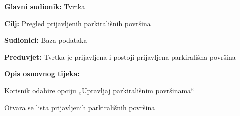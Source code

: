 					\begin{packed_item}
						
						\item  \textbf{Glavni sudionik: } Tvrtka
						\item  \textbf{Cilj:} Pregled prijavljenih parkirališnih površina
						\item  \textbf{Sudionici:} Baza podataka
						\item  \textbf{Preduvjet:} Tvrtka je prijavljena i postoji prijavljena parkirališna površina
						\item  \textbf{Opis osnovnog tijeka:}
						
						\item[] \begin{packed_enum}
							\item Korisnik odabire opciju „Upravljaj parkirališnim površinama“
							\item Otvara se lista prijavljenih parkirališnih površina
						\end{packed_enum}
						
					\end{packed_item}
					
